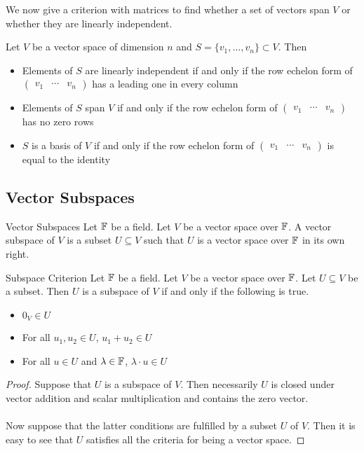 \documentclass[a4paper]{article}
\begin{document}
We now give a criterion with matrices to find whether a set of vectors span $V$ or whether they are linearly independent. 

\begin{thm}{}{} Let $V$ be a vector space of dimension $n$ and $S=\{v_1,\dots,v_n\}\subset V$. Then 
\begin{itemize}
\item Elements of $S$ are linearly independent if and only if the row echelon form of $\begin{pmatrix}v_1 & \cdots & v_n\end{pmatrix}$ has a leading one in every column
\item Elements of $S$ span $V$ if and only if the row echelon form of $\begin{pmatrix}v_1 & \cdots & v_n\end{pmatrix}$ has no zero rows
\item $S$ is a basis of $V$ if and only if the row echelon form of $\begin{pmatrix}v_1 & \cdots & v_n\end{pmatrix}$ is equal to the identity
\end{itemize}
\end{thm}

\subsection{Vector Subspaces}
\begin{defn}{Vector Subspaces}{} Let $\mathbb{F}$ be a field. Let $V$ be a vector space over $\mathbb{F}$. A vector subspace of $V$ is a subset $U\subseteq V$ such that $U$ is a vector space over $\mathbb{F}$ in its own right. 
\end{defn}

\begin{prp}{Subspace Criterion}{} Let $\mathbb{F}$ be a field. Let $V$ be a vector space over $\mathbb{F}$. Let $U\subseteq V$ be a subset. Then $U$ is a subspace of $V$ if and only if the following is true. 
\begin{itemize}
\item $0_V\in U$
\item For all $u_1,u_2\in U$, $u_1+u_2\in U$
\item For all $u\in U$ and $\lambda\in\mathbb{F}$, $\lambda\cdot u\in U$
\end{itemize} \tcbline
\begin{proof}
Suppose that $U$ is a subspace of $V$. Then necessarily $U$ is closed under vector addition and scalar multiplication and contains the zero vector. \\~\\
Now suppose that the latter conditions are fulfilled by a subset $U$ of $V$. Then it is easy to see that $U$ satisfies all the criteria for being a vector space. 
\end{proof}
\end{prp}
\end{document}
